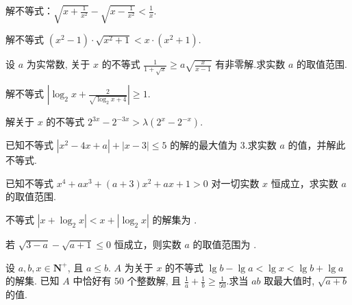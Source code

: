 \documentclass[a4paper , final]{ctexart}
\newenvironment{problem}[1]{%
  \item #1
  \par
  \vspace{8cm}
}{}
\begin{document}
\begin{problems}

  \begin{problem}
  {
  解不等式：$\sqrt{x + \frac{1}{x^2}} - \sqrt{x - \frac{1}{x^2}} < \frac{1}{x}$.
  }
  \end{problem}

  \begin{problem}
  {
  解不等式 $(x^2 - 1) \cdot \sqrt{x^2 + 1} < x \cdot (x^2 + 1)$.
  }
  \end{problem}

  \begin{problem}
  {
  设 $a$ 为实常数, 关于 $x$ 的不等式 $\frac{1}{1+\sqrt{x}} \ge a\sqrt{\frac{x}{x-1}}$ 有非零解.求实数 $a$ 的取值范围.
  }
  \end{problem}

  \begin{problem}
  {
  解不等式 $\left| \log_2 x + \frac{2}{\sqrt{\log_2 x + 4}} \right| \ge 1$.
  }
  \end{problem}

  \begin{problem}
  {
  解关于 $x$ 的不等式 $2^{3x} - 2^{-3x} > \lambda(2^x - 2^{-x})$.
  }
  \end{problem}

  \begin{problem}
  {
  已知不等式 $|x^2 - 4x + a| + |x - 3| \le 5$ 的解的最大值为 $3$.求实数 $a$ 的值，并解此不等式.
  }
  \end{problem}

  \begin{problem}
  {
  已知不等式 $x^4 + ax^3 + (a+3)x^2 + ax + 1 > 0$ 对一切实数 $x$ 恒成立，求实数 $a$ 的取值范围.
  }
  \end{problem}

  \begin{problem}
  {
  不等式 $|x + \log_2 x| < x + |\log_2 x|$ 的解集为 \underline{\hspace{3cm}}.
  }
  \end{problem}

  \begin{problem}
  {
  若 $\sqrt{3-a}-\sqrt{a+1}\le 0$ 恒成立，则实数 $a$ 的取值范围为 \underline{\hspace{3cm}}.
  }
  \end{problem}

  \begin{problem}
  {
    设 $a,b,x \in \mathbf{N}^+$, 且 $a \le b$. $A$ 为关于 $x$ 的不等式 $\lg b - \lg a < \lg x < \lg b + \lg a$ 的解集. 已知 $A$ 中恰好有 $50$ 个整数解, 且 $\frac{1}{a} + \frac{1}{b} \ge \frac{1}{50}$.求当 $ab$ 取最大值时, $\sqrt{a+b}$ 的值.
  }
\end{problem}

\end{problems}

% 
\end{document}
